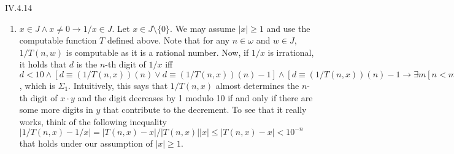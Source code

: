 \documentclass[12pt]{article}
\begin{document}
\begin{customthm}{IV.4.14}
\begin{enumerate}
\begin{enumerate}
\begin{enumerate}
        \item\underline{$y=10^k d$ for some $k\in\mathbb{Z}$ and $d\in10$}. It holds that $\forall k\in\mathbb{Z}\,\forall w\in J[10^k w\in J]$ in general since $10^k w$ is just a shifted one of $w$.
        \item\underline{The decimal expansion of $y$ has finite length}. Decompose $y$ into the digits and reduce it to the previous case.
        \item\underline{$y\in J$}. We may assume $|x|\leq1$ since $x\cdot y=10^k((10^{-k}x)\cdot y)$ holds for $k\in\omega$, where a large enough $k$ makes $|10^{-k}x|\leq1$ true. Let $v=T(i,u)$ say that $v$ is the real number that truncates $u$ at the $i$-th digit, followed by all $0$'s after that. It is obvious that $T$ defines a computable function. Now, if $x\cdot y$ is irrational, it holds that $d$ is the $n$-th digit of $x\cdot y$ iff $d<10\wedge[d\equiv(x\cdot T(n,y))(n)\vee d\equiv(x\cdot T(n,y))(n)+1]\wedge[d\equiv(x\cdot T(n,y))(n)+1\rightarrow\exists m[n<m\wedge d\equiv(x\cdot T(m,y))(n)]]$, which is $\Sigma_1$. Intuitively, this says that $x\cdot T(n,y)$ almost determines the $n$-th digit of $x\cdot y$ and the digit increases by 1 modulo 10 if and only if there are some more digits in $y$ that contribute to the increment. To see that it really works, think of the inequality $|x\cdot T(n,y)-x\cdot y|=|x||T(n,y)-y|\leq|T(n,y)-y|<10^{-n}$ that holds under our assumption of $|x|\leq1$.
      \end{enumerate}
      \item\underline{$x\in J\wedge x\neq0\rightarrow 1/x\in J$}. Let $x\in J\setminus\{0\}$. We may assume $|x|\geq1$ and use the computable function $T$ defined above. Note that for any $n\in\omega$ and $w\in J$, $1/T(n,w)$ is computable as it is a rational number. Now, if $1/x$ is irrational, it holds that $d$ is the $n$-th digit of $1/x$ iff $d<10\wedge[d\equiv(1/T(n,x))(n)\vee d\equiv(1/T(n,x))(n)-1]\wedge[d\equiv(1/T(n,x))(n)-1\rightarrow\exists m[n<m\wedge d\equiv(1/T(m,x))(n)]]$, which is $\Sigma_1$. Intuitively, this says that $1/T(n,x)$ almost determines the $n$-th digit of $x\cdot y$ and the digit decreases by 1 modulo 10 if and only if there are some more digits in $y$ that contribute to the decrement. To see that it really works, think of the following inequality $|1/T(n,x)-1/x|=|T(n,x)-x|/|T(n,x)||x|\leq|T(n,x)-x|<10^{-n}$ that holds under our assumption of $|x|\geq1$.
    \end{enumerate}

\end{enumerate}
\end{customthm}
\end{document}
